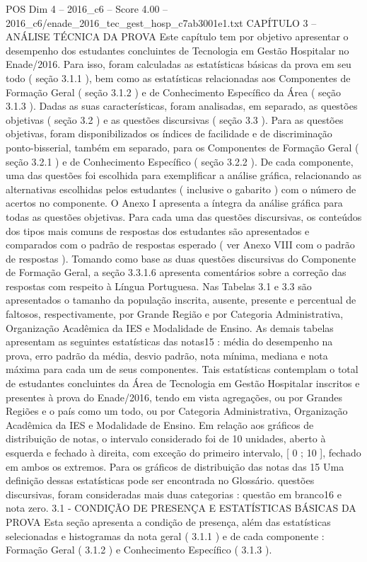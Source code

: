 \begin{textsample}{POS Dim 4 – 2016\_c6 – Score 4.00 – 2016\_c6/enade\_2016\_tec\_gest\_hosp\_c7ab3001e1.txt}  \label{ex:f4_pos_055}
CAPÍTULO 3 – ANÁLISE TÉCNICA DA PROVA Este capítulo tem por objetivo apresentar o desempenho dos estudantes concluintes de Tecnologia em Gestão Hospitalar no Enade/2016.
Para isso, foram calculadas as estatísticas básicas da prova em seu todo ( seção 3.1.1 ), bem como as estatísticas relacionadas aos Componentes de Formação Geral ( seção 3.1.2 ) e de Conhecimento Específico da Área ( seção 3.1.3 ).
Dadas as suas características, foram analisadas, em separado, as questões objetivas ( seção 3.2 ) e as questões discursivas ( seção 3.3 ).
Para as questões objetivas, foram disponibilizados os índices de facilidade e de discriminação ponto-bisserial, também em separado, para os Componentes de Formação Geral ( seção 3.2.1 ) e de Conhecimento Específico ( seção 3.2.2 ).
De cada componente, uma das questões foi escolhida para exemplificar a análise gráfica, relacionando as alternativas escolhidas pelos estudantes ( inclusive o gabarito ) com o número de acertos no componente.
O Anexo I apresenta a íntegra da análise gráfica para todas as questões objetivas.
Para cada uma das questões discursivas, os conteúdos dos tipos mais comuns de respostas dos estudantes são apresentados e comparados com o padrão de respostas esperado ( ver Anexo VIII com o padrão de respostas ).
Tomando como base as duas questões discursivas do Componente de Formação Geral, a seção 3.3.1.6 apresenta comentários sobre a correção das respostas com respeito à Língua Portuguesa.
Nas Tabelas 3.1 e 3.3 são apresentados o tamanho da população inscrita, ausente, presente e percentual de faltosos, respectivamente, por Grande Região e por Categoria Administrativa, Organização Acadêmica da IES e Modalidade de Ensino.
As demais tabelas apresentam as seguintes estatísticas das notas15 : média do desempenho na prova, erro padrão da média, desvio padrão, nota mínima, mediana e nota máxima para cada um de seus componentes.
Tais estatísticas contemplam o total de estudantes concluintes da Área de Tecnologia em Gestão Hospitalar inscritos e presentes à prova do Enade/2016, tendo em vista agregações, ou por Grandes Regiões e o país como um todo, ou por Categoria Administrativa, Organização Acadêmica da IES e Modalidade de Ensino.
Em relação aos gráficos de distribuição de notas, o intervalo considerado foi de 10 unidades, aberto à esquerda e fechado à direita, com exceção do primeiro intervalo, [ 0 ; 10 ], fechado em ambos os extremos.
Para os gráficos de distribuição das notas das 15 Uma definição dessas estatísticas pode ser encontrada no Glossário. questões discursivas, foram consideradas mais duas categorias : questão em branco16 e nota zero. 3.1 - CONDIÇÃO DE PRESENÇA E ESTATÍSTICAS BÁSICAS DA PROVA Esta seção apresenta a condição de presença, além das estatísticas selecionadas e histogramas da nota geral ( 3.1.1 ) e de cada componente : Formação Geral ( 3.1.2 ) e Conhecimento Específico ( 3.1.3 ).

\end{textsample}

